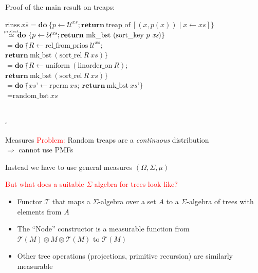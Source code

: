 \documentclass[%
	sans,
	12pt,
]{beamer}
\newcommand{\bad}[1]{\textcolor{red}{#1}}
\begin{document}
\begin{frame}{Proof of the main result on treaps:}
\begin{center}
\parbox{0cm}{
\small
\begin{tabbing}
$\text{rinss}\ \textit{xs} $\=${}= \textbf{do}\ \{p \leftarrow \mathcal U^{\textit{xs}}; \textbf{return}\ \text{treap\_of}\ [(x, p(x))\mid x\leftarrow \textit{xs}]\}$\\[2mm]\pause
\>${}\hskip-1.8mm\stackrel{\text{\tiny project}}\simeq \hskip-1.8mm\textbf{do}\ \{p \leftarrow \mathcal U^{\textit{xs}}; \textbf{return}\ \text{mk\_bst}\ (\text{sort\_key}\ p\ \textit{xs})\}$\\[2mm]\pause
\>${}= \textbf{do}\ \{$\=$R \leftarrow \text{rel\_from\_prios}\ \mathcal U^{\textit{xs}};$\\\>\> $\textbf{return}\ \text{mk\_bst}\ (\text{sort\_rel}\ R\ \textit{xs})\}$\\[2mm]\pause
\>${}= \textbf{do}\ \{$\=$R \leftarrow \text{uniform}\ (\text{linorder\_on}\ R);$\\\>\> $\textbf{return}\ \text{mk\_bst}\ (\text{sort\_rel}\ R\ \textit{xs})\}$\\[2mm]\pause
\>${}= \textbf{do}\ \{$\=$\textit{xs'} \leftarrow \text{rperm}\ \textit{xs};\ \textbf{return}\ \text{mk\_bst}\ \textit{xs'}\}$\\[2mm]\pause
\>${}= \text{random\_bst}\ \textit{xs}$
\end{tabbing}}\\[-2em]\pause
\mbox{}\hspace*{\fill}$\square$\hspace*{1em}
\end{center}
\end{frame}

\begin{frame}{Measures}
\bad{Problem:} Random treaps are a \emph{continuous} distribution\\ $\Longrightarrow$ cannot use PMFs\\[1em]\pause

Instead we have to use general measures $(\Omega, \Sigma, \mu)$\\[1em]\pause

\bad{But what does a suitable $\Sigma$-algebra for trees look like?}\pause
\begin{itemize}
\item Functor $\mathcal T$ that maps a $\Sigma$-algebra over a set $A$ to a $\Sigma$-algebra of trees with elements from $A$\pause
\item The \enquote{Node} constructor is a measurable function from $\mathcal T(M)\otimes M\otimes \mathcal T(M)$ to $\mathcal T(M)$\pause
\item Other tree operations (projections, primitive recursion) are similarly measurable
\end{itemize}
\end{frame}
\end{document}
